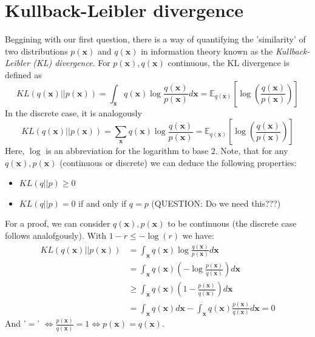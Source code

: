 \documentclass[12pt]{report}
\theoremstyle{definition}
\begin{document}
\section{Kullback-Leibler divergence}
Beggining with our first question, there is a way of quantifying the 'similarity' of two distributions $p(\mathbf{x})$ and $q(\mathbf{x})$ in information theory known as the \emph{Kullback-Leibler (KL) divergence}. For $p(\mathbf{x}), q(\mathbf{x})$ continuous, the KL divergence is defined as %
\begin{equation}
	KL(q(\mathbf{x})||p(\mathbf{x})) = \int_{\mathbf{x}} q(\mathbf{x}) \log \frac{q(\mathbf{x})}{p(\mathbf{x})} d \mathbf{x} = \mathbb{E}_{q(\mathbf{x})}\left[ \log\left(\frac{q(\mathbf{x})}{p(\mathbf{x})} \right) \right]
\end{equation}
In the discrete case, it is analogously 
\begin{equation}
	KL(q(\mathbf{x})||p(\mathbf{x})) = \sum_{\mathbf{x}} q(\mathbf{x}) \log \frac{q(\mathbf{x})}{p(\mathbf{x})} = \mathbb{E}_{q(\mathbf{x})}\left[ \log\left(\frac{q(\mathbf{x})}{p(\mathbf{x})} \right) \right]
\end{equation}
Here, $\log$ is an abbreviation for the logarithm to base $2$. Note, that for any $q(\mathbf{x}), p(\mathbf{x})$ (continuous or discrete) we can deduce the following properties:
\begin{itemize}
	\item $KL(q||p) \geq 0$
	\item $KL(q||p) = 0$ if and only if $q = p$ (QUESTION: Do we need this???)
\end{itemize}
For a proof, we can consider $q(\mathbf{x}), p(\mathbf{x})$ to be continuous (the discrete case follows analofgously). With $1 - r \leq -\log(r)$ we have:
\begin{equation}
\begin{split}
KL(q(\mathbf{x})||p(\mathbf{x})) 
& = \int_{\mathbf{x}} q(\mathbf{x}) \log \frac{q(\mathbf{x})}{p(\mathbf{x})} d \mathbf{x} \\
& = \int_{\mathbf{x}} q(\mathbf{x}) (- \log \frac{p(\mathbf{x})}{q(\mathbf{x})}) d \mathbf{x} \\
& \geq \int_{\mathbf{x}} q(\mathbf{x}) (1 - \frac{p(\mathbf{x})}{q(\mathbf{x})}) d \mathbf{x} \\
& = \int_{\mathbf{x}} q(\mathbf{x}) d \mathbf{x} - \int_{\mathbf{x}} q(\mathbf{x}) \frac{p(\mathbf{x})}{q(\mathbf{x})} d \mathbf{x} = 0 
\end{split}
\end{equation}
And '$=$' $ \Leftrightarrow \frac{p(\mathbf{x})}{q(\mathbf{x})} = 1 \Leftrightarrow p(\mathbf{x})=q(\mathbf{x})$.
\end{document}
